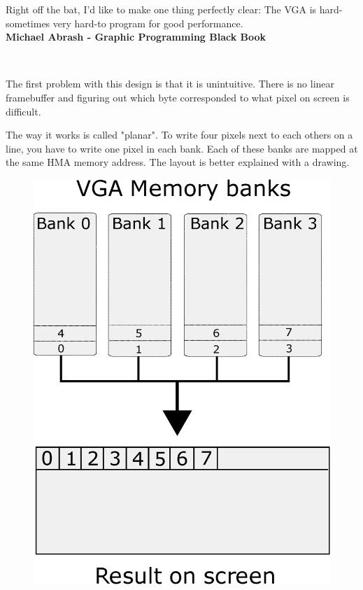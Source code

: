 \documentclass[book.tex]{subfiles}
\begin{document}
 \begin{fancyquotes}
   Right off the bat, I'd like to make one thing perfectly clear: The VGA is hard-sometimes very hard-to program for good performance.
 \bigskip \\
\textbf{Michael Abrash - Graphic Programming Black Book}
 \end{fancyquotes}
 \\
\par
The first problem with this design is that it is unintuitive. There is no linear framebuffer and figuring out which byte corresponded to what pixel on screen is difficult.\\
\par
 The way it works is called "planar". To write four pixels next to each others on a line, you have to write one pixel in each bank. Each of these banks are mapped at the same HMA memory address. The layout is better explained with a drawing.\\
\par
\begin{figure}[H]
\centering
\includegraphics[width=\textwidth]{imgs/drawings/vga_ram_screen_layout.eps}
\label{fig:vga_arch}
\end{figure}
\end{document}

